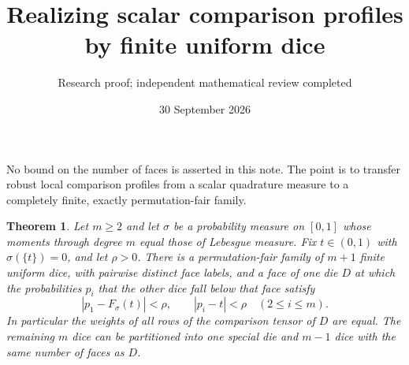 \documentclass[11pt]{article}
\title{Realizing scalar comparison profiles by finite uniform dice}
\author{Research proof; independent mathematical review completed}
\date{30 September 2026}
\newtheorem{theorem}{Theorem}
\begin{document}
\maketitle
No bound on the number of faces is asserted in this note. The point is
to transfer robust local comparison profiles from a scalar quadrature
measure to a completely finite, exactly permutation-fair family.

\begin{theorem}\label{main}
Let $m\ge2$ and let $\sigma$ be a probability measure on $[0,1]$
whose moments through degree $m$ equal those of Lebesgue measure.
Fix $t\in(0,1)$ with $\sigma(\{t\})=0$, and let $\rho>0$.
There is a permutation-fair family of $m+1$ finite uniform dice,
with pairwise distinct face labels, and a face of one die $D$ at which
the probabilities $p_i$ that the other dice fall below that face satisfy
\[
 |p_1-F_\sigma(t)|<\rho,\qquad
 |p_i-t|<\rho\quad(2\le i\le m).
\]
In particular the weights of all rows of the comparison tensor of $D$
are equal. The remaining $m$ dice can be partitioned into one special
die and $m-1$ dice with the same number of faces as $D$.
\end{theorem}
\end{document}
